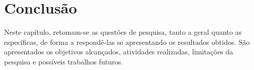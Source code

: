 \chapter{Conclusão}
\label{ch:condicoes}

Neste capítulo, retomam-se as questões de pesquisa, tanto a geral quanto as específicas, de forma a respondê-las se apresentando os resultados obtidos. São apresentados os objetivos alcançados, atividades realizadas, limitações da pesquisa e possíveis trabalhos futuros.










